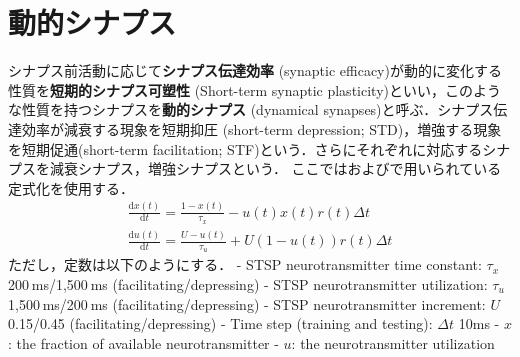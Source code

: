 \section{動的シナプス}シナプス前活動に応じて\textbf{シナプス伝達効率} (synaptic efficacy)が動的に変化する性質を\textbf{短期的シナプス可塑性} (Short-term synaptic plasticity)といい，このような性質を持つシナプスを\textbf{動的シナプス} (dynamical synapses)と呼ぶ．シナプス伝達効率が減衰する現象を短期抑圧 (short-term depression; STD)，増強する現象を短期促通(short-term facilitation; STF)という．さらにそれぞれに対応するシナプスを減衰シナプス，増強シナプスという．
ここでは\cite{Mongillo2008-kk}および\cite{Orhan2019-rq}で用いられている定式化を使用する．
$$
\begin{gathered}
\frac{\mathrm{d} x(t)}{\mathrm{d} t}=\frac{1-x(t)}{\tau_{x}}-u(t) x(t) r(t) \Delta t \\
\frac{\mathrm{d} u(t)}{\mathrm{d} t}=\frac{U-u(t)}{\tau_{u}}+U(1-u(t)) r(t) \Delta t
\end{gathered}
$$
ただし，定数は以下のようにする．
- STSP neurotransmitter time constant: $\tau_x$ 200 ms/1,500 ms (facilitating/depressing)
- STSP neurotransmitter utilization: $\tau_u$ 1,500 ms/200 ms (facilitating/depressing)
- STSP neurotransmitter increment: $U$ 0.15/0.45 (facilitating/depressing)
- Time step (training and testing): $\Delta t$ 10ms
- $x$: the fraction of available neurotransmitter
- $u$: the neurotransmitter utilization